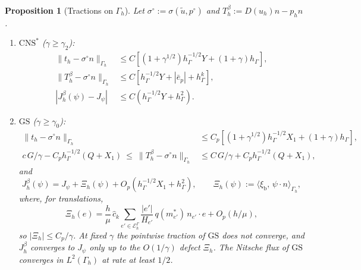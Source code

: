 \documentclass[11pt,reqno]{amsart}
\theoremstyle{plain}
\newtheorem{proposition}[theorem]{Proposition}
\theoremstyle{definition}
\newcommand{\hG}{h_\Gamma}
\newcommand{\Gh}{\Gamma_h}
\newcommand{\EG}{\mathcal E_h^\Gamma}
\newcommand{\ut}{\tilde u}
\newcommand{\ip}[2]{\langle #1,\, #2\rangle}
\newcommand{\norm}[1]{\lVert #1\rVert}
\newcommand{\GS}{\mathrm{GS}}
\newcommand{\CNS}{\mathrm{CNS}^\ast}
\newcommand{\xib}{\xi_{\mathrm b}}
\newcommand{\chat}{\hat c_k}
\begin{document}
\begin{proposition}[Tractions on $\Gh$]\label{pd:prop:beta}
Let $\sigma^\circ:=\sigma(\ut,p^\circ)$ and $T^\beta_h:=D(u_h)n-p_hn$.
\begin{enumerate}[label=(\alph*)]
\item $\CNS$ ($\gamma\ge\gamma_2$):
\begin{align*}
\norm{t_h-\sigma^\circ n}_{\Gh}&\le C[(1+\gamma^{1/2})\hG^{-1/2}Y+(1+\gamma)\hG],\\
\norm{T^\beta_h-\sigma^\circ n}_{\Gh}&\le C[\hG^{-1/2}Y+|\bar e_p|+\hG^k],\\
|J^\beta_h(\psi)-J_\psi|&\le C(\hG^{-1/2}Y+\hG^2).
\end{align*}
\item $\GS$ ($\gamma\ge\gamma_0$):
\begin{align*}
\norm{t_h-\sigma^\circ n}_{\Gh}&\le C_p[(1+\gamma^{1/2})\hG^{-1/2}X_1+(1+\gamma)\hG],\\
c\,G/\gamma-C_p\hG^{-1/2}(Q+X_1)\ \le\ \norm{T^\beta_h-\sigma^\circ n}_{\Gh}&\le C\,G/\gamma+C_p\hG^{-1/2}(Q+X_1),
\end{align*}
and
\[
J^\beta_h(\psi)=J_\psi+\Xi_h(\psi)+O_p(\hG^{-1/2}X_1+\hG^2),\qquad \Xi_h(\psi):=\ip\xib{\psi\cdot n}_{\Gh},
\]
where, for translations,
\[
\Xi_h(e)=\frac h\mu\,\chat\sum_{e'\in\EG}\frac{|e'|}{H_{e'}}\,q(m_{e'}^\ast)\,n_{e'}\cdot e+O_p(h/\mu),
\]
so $|\Xi_h|\le C_p/\gamma$. At fixed $\gamma$ the pointwise traction of $\GS$ does not converge, and $J^\beta_h$ converges to $J_\psi$ only up to the $O(1/\gamma)$ defect $\Xi_h$. The Nitsche flux of $\GS$ converges in $L^2(\Gh)$ at rate at least $1/2$.
\end{enumerate}
\end{proposition}
\end{document}
